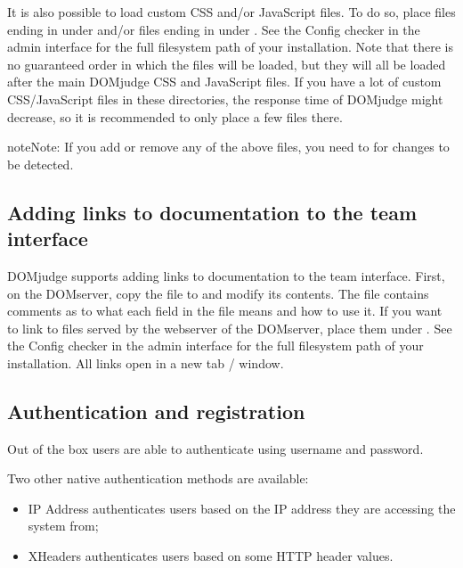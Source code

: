 \documentclass[a4paper,10pt,english,openany]{sphinxmanual}
\begin{document}
\sphinxAtStartPar
It is also possible to load custom CSS and/or JavaScript files. To do so, place
files ending in  under  and/or files ending in 
under . See the Config checker in the admin interface for the
full filesystem path of your installation. Note that there is no guaranteed
order in which the files will be loaded, but they will all be loaded after the
main DOMjudge CSS and JavaScript files. If you have a lot of custom CSS/JavaScript
files in these directories, the response time of DOMjudge might decrease, so it
is recommended to only place a few files there.

\begin{sphinxadmonition}{note}{Note:}
\sphinxAtStartPar
If you add or remove any of the above files, you need to
{\hyperref[\detokenize{config-advanced:clear-cache}]{}} for changes to be detected.
\end{sphinxadmonition}


\subsection{Adding links to documentation to the team interface}
\label{\detokenize{config-advanced:adding-links-to-documentation-to-the-team-interface}}
\sphinxAtStartPar
DOMjudge supports adding links to documentation to the team interface.
First, on the DOMserver, copy the file  to
 and modify its contents. The  file contains
comments as to what each field in the file means and how to use it. If you
want to link to files served by the webserver of the DOMserver, place them
under . See the Config checker in the admin interface for
the full filesystem path of your installation. All links open in a new
tab / window.


\subsection{Authentication and registration}
\label{\detokenize{config-advanced:authentication-and-registration}}\label{\detokenize{config-advanced:authentication}}
\sphinxAtStartPar
Out of the box users are able to authenticate using username and password.

\sphinxAtStartPar
Two other native authentication methods are available:
\begin{itemize}
\item {} 
\sphinxAtStartPar
IP Address \sphinxhyphen{} authenticates users based on the IP address they are accessing
the system from;

\item {} 
\sphinxAtStartPar
X\sphinxhyphen{}Headers \sphinxhyphen{} authenticates users based on some HTTP header values.

\end{itemize}
\end{document}
